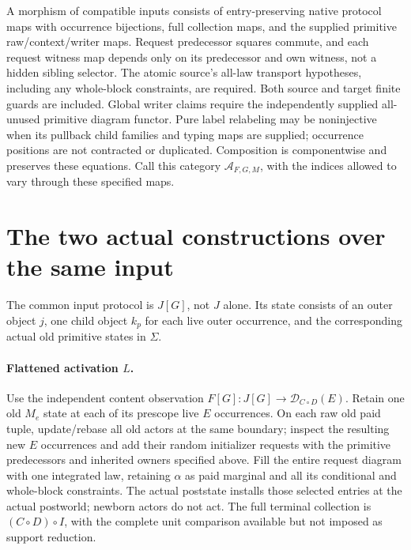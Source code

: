 \documentclass[11pt]{article}\usepackage{amsmath,amssymb,amsthm,geometry}\geometry{margin=1in}
\begin{document}
A morphism of compatible inputs consists of entry-preserving native protocol maps with occurrence bijections, full collection maps, and the supplied primitive raw/context/writer maps. Request predecessor squares commute, and each request witness map depends only on its predecessor and own witness, not a hidden sibling selector. The atomic source's all-law transport hypotheses, including any whole-block constraints, are required. Both source and target finite guards are included. Global writer claims require the independently supplied all-unused primitive diagram functor. Pure label relabeling may be noninjective when its pullback child families and typing maps are supplied; occurrence positions are not contracted or duplicated. Composition is componentwise and preserves these equations. Call this category $\mathcal A_{F,G,M}$, with the indices allowed to vary through these specified maps.

\section{The two actual constructions over the same input}
The common input protocol is $J[G]$, not $J$ alone. Its state consists of an outer object $j$, one child object $k_p$ for each live outer occurrence, and the corresponding actual old primitive states in $\Sigma$.

\paragraph{Flattened activation $L$.} Use the independent content observation
$F[G]:J[G]\to\mathcal D_{C\circ D}(E)$. Retain one old $M_e$ state at each of its prescope live $E$ occurrences. On each raw old paid tuple, update/rebase all old actors at the same boundary; inspect the resulting new $E$ occurrences and add their random initializer requests with the primitive predecessors and inherited owners specified above. Fill the entire request diagram with one integrated law, retaining $\alpha$ as paid marginal and all its conditional and whole-block constraints. The actual poststate installs those selected entries at the actual postworld; newborn actors do not act. The full terminal collection is $(C\circ D)\circ I$, with the complete unit comparison available but not imposed as support reduction.
\end{document}
